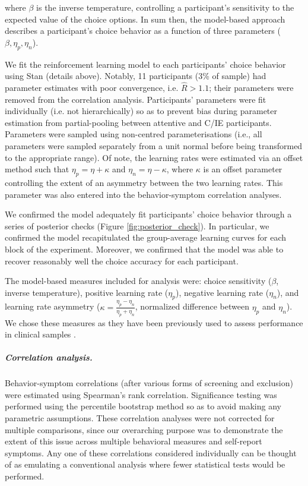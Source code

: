 \documentclass[a4paper,notitlepage,12pt]{article}
\begin{document}
\begin{refsection}[main]
where $\beta$ is the inverse temperature, controlling a participant's sensitivity to the expected value of the choice options. In sum then, the model-based approach describes a participant's choice behavior as a function of three parameters ($\beta, \eta_p, \eta_n$). 

We fit the reinforcement learning model to each participants' choice behavior using Stan (details above). Notably, 11 participants (3\% of sample) had parameter estimates with poor convergence, i.e. $\hat{R} > 1.1$; their parameters were removed from the correlation analysis. Participants' parameters were fit individually (i.e. not hierarchically) so as to prevent bias during parameter estimation from partial-pooling between attentive and C/IE participants. Parameters were sampled using non-centred parameterisations (i.e., all parameters were sampled separately from a unit normal before being transformed to the appropriate range). Of note, the learning rates were estimated via an offset method such that $\eta_p = \eta + \kappa$ and $\eta_n = \eta - \kappa$, where $\kappa$ is an offset parameter controlling the extent of an asymmetry between the two learning rates. This parameter was also entered into the behavior-symptom correlation analyses. 

We confirmed the model adequately fit participants' choice behavior through a series of posterior checks (Figure \ref{fig:posterior_check}). In particular, we confirmed the model recapitulated the group-average learning curves for each block of the experiment. Moreover, we confirmed that the model was able to recover reasonably well the choice accuracy for each participant.

The model-based measures included for analysis were: choice sensitivity ($\beta$,  inverse temperature), positive learning rate ($\eta_p$), negative learning rate ($\eta_n$), and learning rate asymmetry ($\kappa = \frac{\eta_p-\eta_n}{\eta_p+\eta_n}$, normalized difference between $\eta_p$ and $\eta_n$). We chose these measures as they have been previously used to assess performance in clinical samples \cite{huang2017computational, brolsma2020challenging, mukherjee_reward_2020, ritschel2017neural}. 

\subparagraph{Correlation analysis.} Behavior-symptom correlations (after various forms of screening and exclusion) were estimated using Spearman's rank correlation. Significance testing was performed using the percentile bootstrap method \cite{wilcox2018guide} so as to avoid making any parametric assumptions. These correlation analyses were not corrected for multiple comparisons, since our overarching purpose was to demonstrate the extent of this issue across multiple behavioral measures and self-report symptoms. Any one of these correlations considered individually can be thought of as emulating a conventional analysis where fewer statistical tests would be performed.


\end{refsection}
\end{document}
